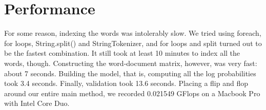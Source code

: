 \documentclass[11pt]{article}
\begin{document}
\section{Performance}
For some reason, indexing the words was intolerably slow.  We tried using foreach, for loops, String.split() and StringTokenizer, and for loops and split turned out to be the fastest combination.  It still took at least 10 minutes to index all the words, though.  Constructing the word-document matrix, however, was very fast: about 7 seconds.  Building the model, that is, computing all the log probabilities took 3.4 seconds.  Finally, validation took 13.6 seconds.  Placing a flip and flop around our entire main method, we recorded 0.021549 GFlops on a Macbook Pro with Intel Core Duo.
\end{document}
